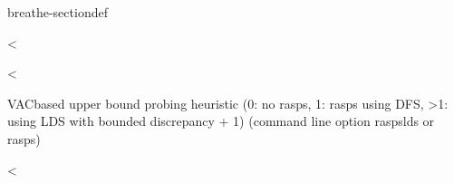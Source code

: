 \documentclass[letterpaper,10pt,openany,oneside,english]{sphinxmanual}
\begin{document}
\begin{fulllineitems}
\begin{sphinxuseclass}{breathe-sectiondef}
\begin{fulllineitems}
\end{fulllineitems}


\begin{fulllineitems}
\label{\detokenize{ref/ref_cpp:_CPPv4N8ToulBar28useRASPSE}}\label{\detokenize{ref/ref_cpp:_CPPv3N8ToulBar28useRASPSE}}\label{\detokenize{ref/ref_cpp:_CPPv2N8ToulBar28useRASPSE}}\label{\detokenize{ref/ref_cpp:ToulBar2::useRASPS__i}}
\pysigstartsignatures
\pysigstartmultiline
{}
\pysigstopmultiline
\pysigstopsignatures
\sphinxAtStartPar
\textless{} 

\end{fulllineitems}


\begin{fulllineitems}
\label{\detokenize{ref/ref_cpp:_CPPv4N8ToulBar210RASPSresetE}}\label{\detokenize{ref/ref_cpp:_CPPv3N8ToulBar210RASPSresetE}}\label{\detokenize{ref/ref_cpp:_CPPv2N8ToulBar210RASPSresetE}}\label{\detokenize{ref/ref_cpp:ToulBar2::RASPSreset__b}}
\pysigstartsignatures
\pysigstartmultiline
{}
\pysigstopmultiline
\pysigstopsignatures
\sphinxAtStartPar
\textless{} 

\sphinxAtStartPar
VAC\sphinxhyphen{}based upper bound probing heuristic (0: no rasps, 1: rasps using DFS, \textgreater{}1: using LDS with bounded discrepancy + 1) (command line option \sphinxhyphen{}raspslds or \sphinxhyphen{}rasps) 

\end{fulllineitems}


\begin{fulllineitems}
\label{\detokenize{ref/ref_cpp:_CPPv4N8ToulBar210RASPSangleE}}\label{\detokenize{ref/ref_cpp:_CPPv3N8ToulBar210RASPSangleE}}\label{\detokenize{ref/ref_cpp:_CPPv2N8ToulBar210RASPSangleE}}\label{\detokenize{ref/ref_cpp:ToulBar2::RASPSangle__i}}
\pysigstartsignatures
\pysigstartmultiline
{}
\pysigstopmultiline
\pysigstopsignatures
\sphinxAtStartPar
\textless{} 


\end{fulllineitems}
\end{sphinxuseclass}
\end{fulllineitems}
\end{document}
